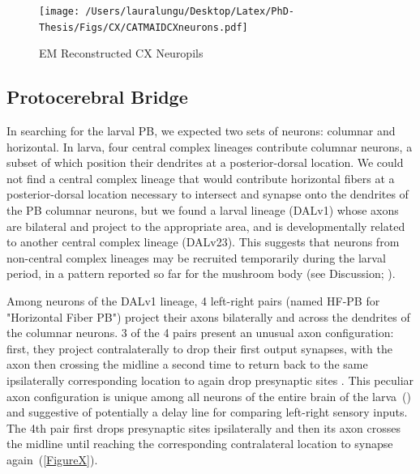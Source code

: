     \begin{figure}
        \centering
        \texttt{[image: /Users/lauralungu/Desktop/Latex/PhD-Thesis/Figs/CX/CATMAIDCXneurons.pdf]}
        \caption[EM Reconstructed CX Neuropils]{EM Reconstructed CX Neuropils}
        \label{cxdiagram}
    \end{figure}

    \subsection{Protocerebral Bridge}
    \label{PB}
    In searching for the larval PB, we expected two sets of neurons: columnar and horizontal. In larva, four central complex lineages contribute columnar neurons, a subset of which position their dendrites at a posterior-dorsal location. We could not find a central complex lineage that would contribute horizontal fibers at a posterior-dorsal location necessary to intersect and synapse onto the dendrites of the PB columnar neurons, but we found a larval lineage (DALv1) whose axons are bilateral and project to the appropriate area, and is developmentally related to another central complex lineage (DALv23). This suggests that neurons from non-central complex lineages may be recruited temporarily during the larval period, in a pattern reported so far for the mushroom body (see Discussion; \citep{truman2023metamorphosis}). 

    Among neurons of the DALv1 lineage, 4 left-right pairs (named HF-PB for "Horizontal Fiber PB") project their axons bilaterally and across the dendrites of the columnar neurons.
    3 of the 4 pairs present an unusual axon configuration: first, they project contralaterally to drop their first output synapses, with the axon then crossing the midline a second time to return back to the same ipsilaterally corresponding location to again drop presynaptic sites .
    This peculiar axon configuration is unique among all neurons of the entire brain of the larva~(\citep{winding2023connectome}) and suggestive of potentially a delay line for comparing left-right sensory inputs.
    The 4th pair first drops presynaptic sites ipsilaterally and then its axon crosses the midline until reaching the corresponding contralateral location to synapse again~(\ref{FigureX}).


